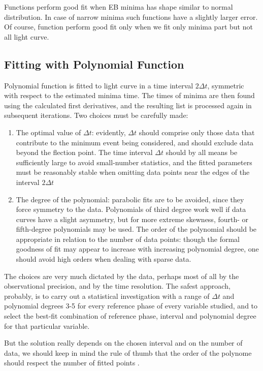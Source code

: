 Functions perform good fit when EB minima has shape similar to normal distribution. In case of narrow minima such functions have a slightly larger error. Of course, function perform good fit only when we fit only minima part but not all light curve.

\subsection{Fitting with Polynomial Function}
Polynomial function is fitted to light curve in a time interval $2 \Delta t$, symmetric with respect
to the estimated minima time. The times of minima are then found using 
the calculated first derivatives, and the resulting list is processed again in
subsequent iterations. Two choices must be carefully made:
\begin{enumerate}
\item The optimal value of $\Delta t$: evidently, $\Delta t$ should comprise only those data
that contribute to the minimum event being considered, and should exclude 
data beyond the flection point. The time interval $\Delta t$ should by all
means be sufficiently large to avoid small-number statistics, and the fitted
parameters must be reasonably stable when omitting data points near the
edges of the interval $2 \Delta t$
\item The degree of the polynomial: parabolic fits are to be avoided, since they
force symmetry to the data. Polynomials of third degree work well if data
curves have a slight asymmetry, but for more extreme skewness, fourth- or
fifth-degree polynomials may be used. The order of the polynomial should
be appropriate in relation to the number of data points: though the formal
goodness of fit may appear to increase with increasing polynomial degree,
one should avoid high orders when dealing with sparse data.
\end{enumerate}

The choices are very much dictated by the data, perhaps most of all by the
observational precision, and by the time resolution.
The safest approach, probably, is to carry out a statistical investigation with a range of $\Delta t$ and polynomial
degrees 3-5 for every reference phase of every variable studied, and to select the
best-fit combination of reference phase, interval and polynomial degree for that
particular variable.

But the solution really depends on the chosen interval
and on the number of data, we should keep in mind the rule of thumb that the order
of the polynome should respect the number of fitted points \citep{Sterken2005basic}.

